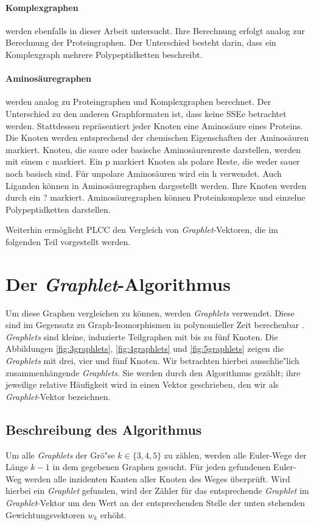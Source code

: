 \documentclass{report}
\begin{document}
\paragraph{Komplexgraphen}

werden ebenfalls in dieser Arbeit untersucht. Ihre Berechnung erfolgt analog zur Berechnung der Proteingraphen. Der Unterschied besteht darin, dass ein Komplexgraph mehrere Polypeptidketten beschreibt.

\paragraph{Aminos\"auregraphen} werden analog zu Proteingraphen und Komplexgraphen berechnet. Der Unterschied zu den anderen Graphformaten ist, dass keine SSEe betrachtet werden. Stattdessen repr\"asentiert jeder Knoten eine Aminos\"aure eines Proteins. Die Knoten werden entsprechend der chemischen Eigenschaften der Aminos\"auren markiert. Knoten, die saure oder basische Aminos\"aurenreste darstellen, werden mit einem c markiert. Ein p markiert Knoten als polare Reste, die weder sauer noch basisch sind. F\"ur unpolare Aminos\"auren wird ein h verwendet. Auch Liganden k\"onnen in Aminos\"auregraphen dargestellt werden. Ihre Knoten werden durch ein ? markiert. Aminos\"auregraphen k\"onnen Proteinkomplexe und einzelne Polypeptidketten darstellen.


Weiterhin erm\"oglicht PLCC den Vergleich von \textit{Graphlet}-Vektoren, die im folgenden Teil vorgestellt werden.


\section{Der \textit{Graphlet}-Algorithmus}


Um diese Graphen vergleichen zu k\"onnen, werden \textit{Graphlets} verwendet. Diese sind im Gegensatz zu Graph-Isomorphismen in polynomieller Zeit berechenbar \cite{sherv_graphlets}. \textit{Graphlets} sind kleine, induzierte Teilgraphen mit bis zu f\"unf Knoten. Die Abbildungen \ref{fig:3graphlets}, \ref{fig:4graphlets} und \ref{fig:5graphlets} zeigen die \textit{Graphlets} mit drei, vier und f\"unf Knoten. Wir betrachten hierbei ausschlie"lich zusammenh\"angende \textit{Graphlets}. Sie werden durch den Algorithmus gez\"ahlt; ihre jeweilige relative H\"aufigkeit wird in einen Vektor geschrieben, den wir als \textit{Graphlet}-Vektor bezeichnen.


\subsection{Beschreibung des Algorithmus}
Um alle \textit{Graphlets} der Gr\"o"se $k \in \{3,4,5\}$ zu z\"ahlen, werden alle Euler-Wege der L\"ange $k-1$ in dem gegebenen Graphen gesucht. F\"ur jeden gefundenen Euler-Weg werden alle inzidenten Kanten aller Knoten des Weges \"uberpr\"uft. Wird hierbei ein \textit{Graphlet} gefunden, wird der Z\"ahler f\"ur das entsprechende \textit{Graphlet} im \textit{Graphlet}-Vektor um den Wert an der entsprechenden Stelle der unten stehenden Gewichtungsvektoren $w_k$ erh\"oht.
\end{document}
